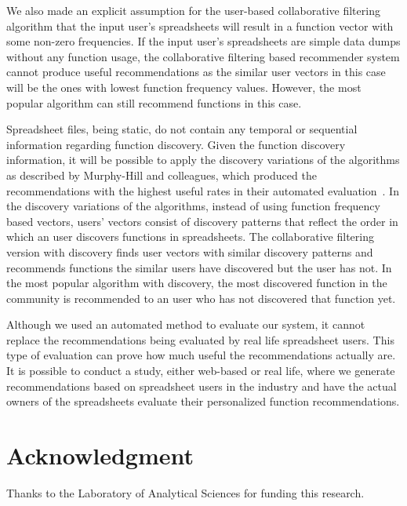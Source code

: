 \documentclass[conference]{IEEEtran}
\begin{document}
We also made an explicit assumption for the user-based collaborative filtering algorithm that the input user's spreadsheets will result in a function vector with some non-zero frequencies. If the input user's spreadsheets are simple data dumps without any function usage, the collaborative filtering based recommender system cannot produce useful recommendations as the similar user vectors in this case will be the ones with lowest function frequency values. However, the most popular algorithm can still recommend functions in this case.

Spreadsheet files, being static, do not contain any temporal or sequential information regarding function discovery. Given the function discovery information, it will be possible to apply the discovery variations of the algorithms as described by Murphy-Hill and colleagues, which produced the recommendations with the highest useful rates in their automated evaluation~\cite{murphy2012improving}. In the discovery variations of the algorithms, instead of using function frequency based vectors, users' vectors consist of discovery patterns that reflect the order in which an user discovers functions in spreadsheets. The collaborative filtering version with discovery finds user vectors with similar discovery patterns and recommends functions the similar users have discovered but the user has not. In the most popular algorithm with discovery, the most discovered function in the community is recommended to an user who has not discovered that function yet.

Although we used an automated method to evaluate our system, it cannot replace the recommendations being evaluated by real life spreadsheet users. This type of evaluation can prove how much useful the recommendations actually are. It is possible to conduct a study, either web-based or real life, where we generate recommendations based on spreadsheet users in the industry and have the actual owners of the spreadsheets evaluate their personalized function recommendations.

\section*{Acknowledgment}
Thanks to the Laboratory of Analytical Sciences for funding this research.


\end{document}
